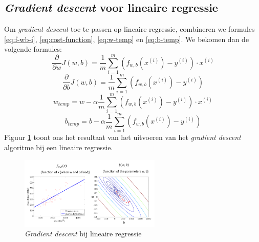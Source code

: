 \subsection{\textit{Gradient descent} voor lineaire regressie}

Om \textit{gradient descent} toe te passen op lineaire regressie, combineren we formules \ref{eq:f-wb-i}, \ref{eq:cost-function}, \ref{eq:w-temp} en \ref{eq:b-temp}. We bekomen dan de volgende formules:
\begin{equation}
	\frac{\partial}{\partial w}J(w, b) = \frac{1}{m}\sum_{i=1}^{m}(f_{w,b}(x^{(i)}) - y^{(i)}) \cdot x^{(i)}
\end{equation}
\begin{equation}
	\frac{\partial}{\partial b}J(w, b) = \frac{1}{m}\sum_{i=1}^{m}(f_{w,b}(x^{(i)}) - y^{(i)})
\end{equation}
\begin{equation}
	w_{temp} = w - \alpha \frac{1}{m}\sum_{i=1}^{m}(f_{w,b}(x^{(i)}) - y^{(i)}) \cdot x^{(i)}
\end{equation}
\begin{equation}
	b_{temp} = b - \alpha \frac{1}{m}\sum_{i=1}^{m}(f_{w,b}(x^{(i)}) - y^{(i)})
\end{equation}
\noindent
Figuur \ref{fig:gradient-descent} toont ons het resultaat van het uitvoeren van het \textit{gradient descent} algoritme bij een lineaire regressie.
\begin{figure}[h]
	\centering
	\includegraphics[width=0.6\textwidth]{images/7-gradient-descent.png}
	\caption{\textit{Gradient descent} bij lineaire regressie}
	\label{fig:gradient-descent}
\end{figure}

